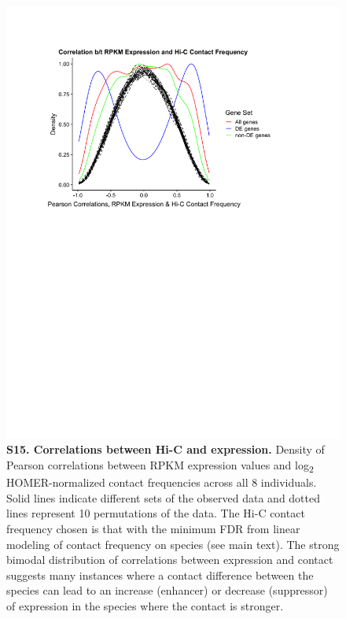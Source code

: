 \begin{figure}[!htb]
\centering
\includegraphics[width=6in]{img/figS15.pdf}
\caption[Correlations between Hi-C and expression.]{\textbf{S15. Correlations between Hi-C and expression.} Density of Pearson correlations between RPKM expression values and log\textsubscript{2} HOMER-normalized contact frequencies across all 8 individuals. Solid lines indicate different sets of the observed data and dotted lines represent 10 permutations of the data. The Hi-C contact frequency chosen is that with the minimum FDR from linear modeling of contact frequency on species (see main text). The strong bimodal distribution of correlations between expression and contact suggests many instances where a contact difference between the species can lead to an increase (enhancer) or decrease (suppressor) of expression in the species where the contact is stronger.}
\label{fig:ch02-figS15}
\end{figure}

